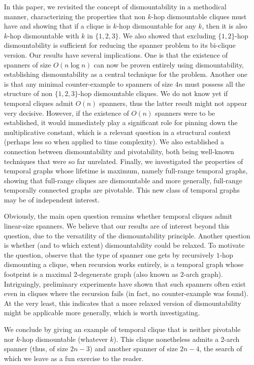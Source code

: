 \documentclass[USenglish, a4paper, thm-restate,numberwithinsect, cleveref]{lipics-v2021}
\begin{document}
In this paper, we revisited the concept of dismountability in a methodical manner, characterizing the properties that non $k$-hop dismountable cliques must have and showing that if a clique is $k$-hop dismountable for any $k$, then it is also $k$-hop dismountable with $k$ in $\{1,2,3\}$. We also showed that excluding $\{1,2\}$-hop dismountability is sufficient for reducing the spanner problem to its bi-clique version. Our results have several implications. One is that the existence of spanners of size $O(n \log n)$ can now be proven entirely using dismountability, establishing dismountability as a central technique for the problem. Another one is that any minimal counter-example to spanners of size $4n$ must possess all the structure of non $\{1,2,3\}$-hop dismountable cliques. We do not know yet if temporal cliques admit $O(n)$ spanners, thus the latter result might not appear very decisive. However, if the existence of $O(n)$ spanners were to be established, it would immediately play a significant role for pinning down the multiplicative constant, which is a relevant question in a structural context (perhaps less so when applied to time complexity). We also established a connection between dismountability and pivotability, both being well-known techniques that were so far unrelated. Finally, we investigated the properties of temporal graphs whose lifetime is maximum, namely full-range temporal graphs, showing that full-range cliques are dismountable and more generally, full-range temporally connected graphs are pivotable. This new class of temporal graphs may be of independent interest.

Obviously, the main open question remains whether temporal cliques admit linear-size spanners. We believe that our results are of interest beyond this question, due to the versatility of the dismountability principle. Another question is whether (and to which extent) dismountability could be relaxed. To motivate the question, observe that the type of spanner one gets by recursively $1$-hop dismounting a clique, when recursion works entirely, is a temporal graph whose footprint is a maximal $2$-degenerate graph (also known as $2$-arch graph). Intriguingly, preliminary experiments have shown that such spanners often exist even in cliques where the recursion fails (in fact, no counter-example was found). At the very least, this indicates that a more relaxed version of dismountability might be applicable more generally, which is worth investigating.

We conclude by giving an example of temporal clique that is neither pivotable nor $k$-hop dismountable (whatever $k$). This clique nonetheless admits a 2-arch spanner (thus, of size $2n - 3$) and another spanner of size $2n - 4$, the search of which we leave as a fun exercise to the reader.
\end{document}
